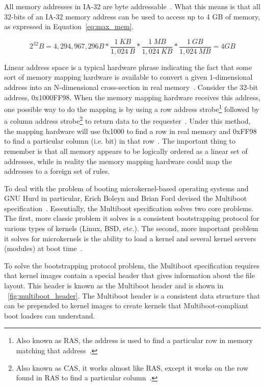 All memory addresses in IA-32 are
{\important byte addressable}~\cite{ia32-1-2004}.  What
this means is that all 32-bits of an IA-32 memory address can be used to
access up to 4 GB of memory, as expressed in Equation~\ref{eq:max_mem}.

\begin{equation}
2^{32} B = 4,294,967,296 B *
\frac{1~KB}{1,024~B} * \frac{1~MB}{1,024~KB} * \frac{1~GB}{1,024~MB} =
4 GB
\label{eq:max_mem}
\end{equation}

{\important Linear address space} is a typical hardware phrase indicating the
fact that some sort of memory mapping hardware is available to convert a
given 1-dimensional address into an N-dimensional cross-section in
real memory~\cite{hennessy2003}.  Consider the 32-bit address, 0x1000FF98.
When the memory mapping hardware receives this address, one possible way
to do the mapping is by using a row address
strobe\footnote{Also known as RAS, the address is used to find a
particular row in memory matching that address~\cite{hennessy2003}.}
followed by a column address
strobe\footnote{Also known as CAS, it works almost like RAS, except it
works on the row found in RAS to find a particular column~\cite{hennessy2003}.}
to return data to the requester~\cite{hennessy2003}.  Under this
method, the mapping hardware will use 0x1000 to find a row in real memory
and 0xFF98 to find a particular column (i.e. bit) in that
row~\cite{hennessy2003}.  The important thing to remember is that all
memory appears to be logically ordered as a linear set of addresses, while
in reality the memory mapping hardware could map the addresses to a foreign
set of rules.

To deal with the problem of booting microkernel-based operating systems and
GNU Hurd in particular, Erich Boleyn and Brian Ford devised the Multiboot
specification~\cite{grub_info}.  Essentially, the Multiboot specification
solves two core problems.  The first, more classic problem it solves is a
consistent bootstrapping protocol for various types of kernels
(Linux, BSD, etc.).  The second, more important problem it solves for
microkernels is the ability to load a kernel and several kernel servers
(modules) at boot time~\cite{multiboot_info}.

To solve the bootstrapping protocol problem, the Multiboot specification
requires that kernel images contain a special header that
gives information about the file layout.  This header is known as the
{\code Multiboot header} and is shown in
\figurename~\ref{fig:multiboot_header}.  The Multiboot header is a consistent
data structure that can be prepended to kernel images to create kernels that
Multiboot-compliant boot loaders can understand.

